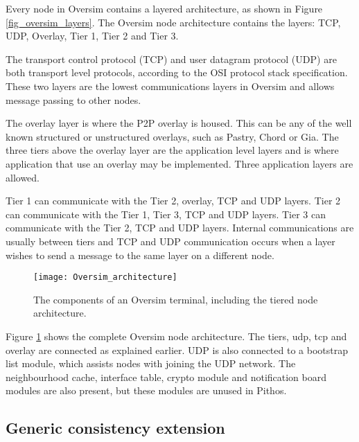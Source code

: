 
Every node in Oversim contains a layered architecture, as shown in Figure \ref{fig_oversim_layers}. The Oversim node architecture contains the layers: TCP, UDP, Overlay, Tier 1, Tier 2 and Tier 3.

The transport control protocol (TCP) and user datagram protocol (UDP) are both transport level protocols, according to the OSI protocol stack specification. These two layers are the lowest communications layers in Oversim and allows message passing to other nodes.

The overlay layer is where the P2P overlay is housed. This can be any of the well known structured or unstructured overlays, such as Pastry, Chord or Gia. The three tiers above the overlay layer are the application level layers and is where application that use an overlay may be implemented. Three application layers are allowed.

Tier 1 can communicate with the Tier 2, overlay, TCP and UDP layers. Tier 2 can communicate with the Tier 1, Tier 3, TCP and UDP layers. Tier 3 can communicate with the Tier 2, TCP and UDP layers. Internal communications are usually between tiers and TCP and UDP communication occurs when a layer wishes to send a message to the same layer on a different node.

\begin{figure}[htbp]
 \centering
 \texttt{[image: Oversim\_architecture]}
 \caption{The components of an Oversim terminal, including the tiered node architecture.}
 \label{fig_oversim_architecture}
\end{figure}
%
Figure \ref{fig_oversim_architecture} shows the complete Oversim node architecture. The tiers, udp, tcp and overlay are connected as explained earlier. UDP is also connected to a bootstrap list module, which assists nodes with joining the UDP network. The neighbourhood cache, interface table, crypto module and notification board modules are also present, but these modules are unused in Pithos.

    \subsection{Generic consistency extension}
    \label{generic_consistency_extension}


